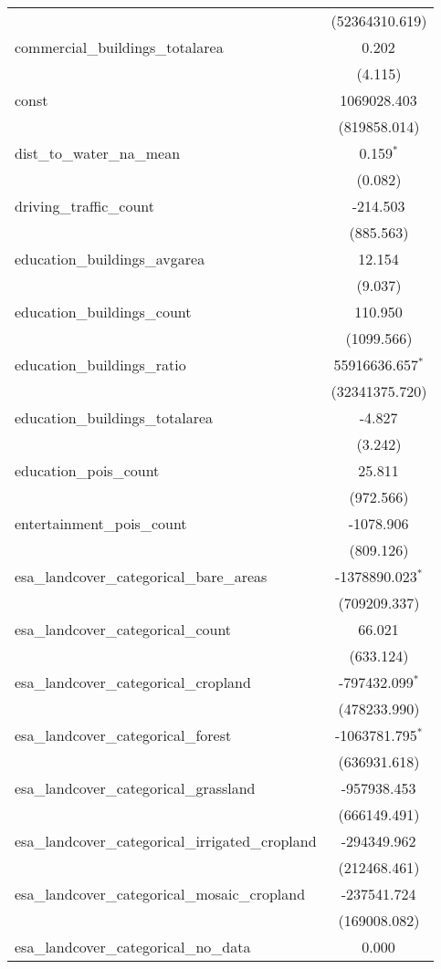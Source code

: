 \begin{table}[!htbp]
\begin{tabular}{@{\extracolsep{5pt}}lc}
  & (52364310.619) \\
 commercial_buildings_totalarea & 0.202$^{}$ \\
  & (4.115) \\
 const & 1069028.403$^{}$ \\
  & (819858.014) \\
 dist_to_water_na_mean & 0.159$^{*}$ \\
  & (0.082) \\
 driving_traffic_count & -214.503$^{}$ \\
  & (885.563) \\
 education_buildings_avgarea & 12.154$^{}$ \\
  & (9.037) \\
 education_buildings_count & 110.950$^{}$ \\
  & (1099.566) \\
 education_buildings_ratio & 55916636.657$^{*}$ \\
  & (32341375.720) \\
 education_buildings_totalarea & -4.827$^{}$ \\
  & (3.242) \\
 education_pois_count & 25.811$^{}$ \\
  & (972.566) \\
 entertainment_pois_count & -1078.906$^{}$ \\
  & (809.126) \\
 esa_landcover_categorical_bare_areas & -1378890.023$^{*}$ \\
  & (709209.337) \\
 esa_landcover_categorical_count & 66.021$^{}$ \\
  & (633.124) \\
 esa_landcover_categorical_cropland & -797432.099$^{*}$ \\
  & (478233.990) \\
 esa_landcover_categorical_forest & -1063781.795$^{*}$ \\
  & (636931.618) \\
 esa_landcover_categorical_grassland & -957938.453$^{}$ \\
  & (666149.491) \\
 esa_landcover_categorical_irrigated_cropland & -294349.962$^{}$ \\
  & (212468.461) \\
 esa_landcover_categorical_mosaic_cropland & -237541.724$^{}$ \\
  & (169008.082) \\
 esa_landcover_categorical_no_data & 0.000$^{}$ \\

\end{tabular}
\end{table}
